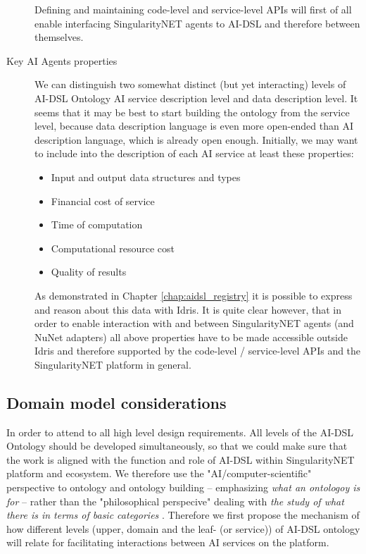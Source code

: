 \documentclass[]{report}
\begin{document}
\begin{description}
  Defining and maintaining code-level and service-level APIs will first of all
  enable interfacing SingularityNET agents to AI-DSL and therefore between
  themselves.

  \item[Key AI Agents properties] We can distinguish two somewhat distinct (but
  yet interacting) levels of AI-DSL Ontology AI service description level and
  data description level. It seems that it may be best to start building the
  ontology from the service level, because data description language is even
  more open-ended than AI description language, which is already open enough.
  Initially, we may want to include into the description of each AI service at
  least these properties:
  \begin{itemize}
  \item Input and output data structures and types
  \item Financial cost of service
  \item Time of computation
  \item Computational resource cost
  \item Quality of results
  \end{itemize}
  As demonstrated in Chapter \ref{chap:aidsl_registry} it is
  possible to express and reason about this data with Idris. It is
  quite clear however, that in order to enable interaction with and
  between SingularityNET agents (and NuNet adapters) all above
  properties have to be made accessible outside Idris and therefore
  supported by the code-level / service-level APIs and the
  SingularityNET platform in general.

\end{description}

\subsection{Domain model considerations}
\label{sec:domain_model_considerations}


In order to attend to all high level design requirements. All levels
of the AI-DSL
Ontology should be developed simultaneously, so that we could make sure that the
work is aligned with the function and role of AI-DSL within SingularityNET
platform and ecosystem. We therefore use the "AI/computer-scientific"
perspective to ontology and ontology building -- emphasizing \textit{what an
ontologoy is for} -- rather than the "philosophical perspecive" dealing with
\textit{the study of what there is in terms of basic categories}
\cite{gruber_translation_1993,sep-logic-ontology}. Therefore we first propose
the  mechanism of how different levels (upper, domain and the leaf- (or
service)) of AI-DSL ontology will relate for facilitating interactions between
AI services on the platform.
\end{document}
